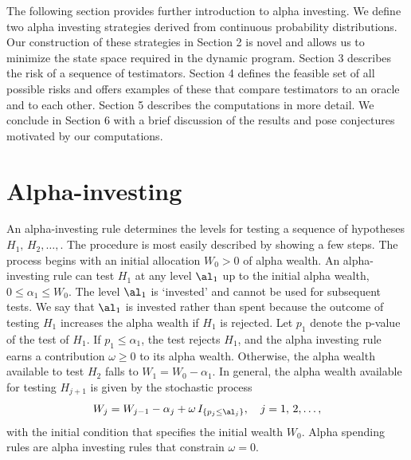 \documentclass[12pt]{article}
\begin{document}
 The following section provides further introduction to alpha investing.  We
 define two alpha investing strategies derived from continuous probability
 distributions.  Our construction of these strategies in Section 2 is novel and
 allows us to minimize the state space required in the dynamic program.  Section
 3 describes the risk of a sequence of testimators.  Section 4 defines the
 feasible set of all possible risks and offers examples of these that compare
 testimators to an oracle and to each other.  Section 5 describes the
 computations in more detail.  We conclude in Section 6 with a brief discussion
 of the results and pose conjectures motivated by our computations.



\section{ Alpha-investing }

 An alpha-investing rule \citep{fosterstine08} determines the levels for testing
 a sequence of hypotheses $H_1, \,H_2, \dots,$.  The procedure is most easily described
 by showing a few steps.  The process begins with an initial allocation $W_0 >
 0$ of alpha wealth.    An alpha-investing rule can test $H_1$ at
 any level $\al_1$ up to the initial alpha wealth, $0 \le \alpha_1 \le W_0$.
  The level $\al_1$ is `invested' and cannot be used for subsequent tests.  We
 say that $\al_1$ is invested rather than spent because  the
 outcome of testing $H_1$ increases the alpha wealth if $H_1$ is rejected.  Let $p_1$ denote
 the p-value of the test of $H_1$.  If $p_1 \le \alpha_1$, the test rejects
 $H_1$, and the alpha investing rule earns a contribution $\omega \ge
 0$ to its alpha wealth.  Otherwise, the alpha wealth available to test $H_2$
 falls to $W_1 = W_0 - \alpha_1$.  In general, the alpha wealth available for
 testing $H_{j+1}$ is given by the stochastic process
 \begin{equation}
    W_j = W_{j-1} - \alpha_j + \omega \, I_{\{p_j \le \al_j\}}, 
       \quad j = 1,\,2,\ldots,
 \label{eq:Wj}
 \end{equation}
 with the initial condition that specifies the initial wealth $W_0$.  Alpha
 spending rules are alpha investing rules that constrain $\omega = 0$.
\end{document}
